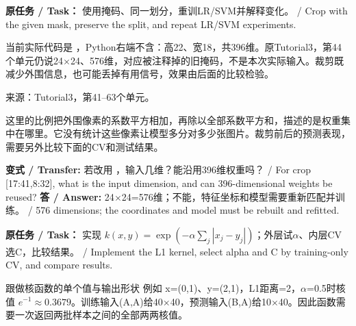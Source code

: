 \textbf{原任务 / Task：} 使用掩码、同一划分，重训LR/SVM并解释变化。 / Crop with the given mask, preserve the split, and repeat LR/SVM experiments.


当前实际代码是 ，Python右端不含：高22、宽18，共396维。原Tutorial3，第44个单元仍说24\ensuremath{\times}24、576维，对应被注释掉的旧掩码，不是本次实际输入。裁剪既减少外围信息，也可能丢掉有用信号，效果由后面的比较检验。


来源：Tutorial3，第41–63个单元。












这里的比例把外围像素的系数平方相加，再除以全部系数平方和，描述的是权重集中在哪里。它没有统计这些像素让模型多分对多少张图片。裁剪前后的预测表现，需要另外比较下面的CV和测试结果。


\textbf{变式 / Transfer:} 若改用 ，输入几维？能沿用396维权重吗？ / For crop [17:41,8:32], what is the input dimension, and can 396-dimensional weights be reused?
\textbf{答 / Answer:} 24\ensuremath{\times}24=576维；不能，特征坐标和模型需要重新匹配并训练。 / 576 dimensions; the coordinates and model must be rebuilt and refitted.







\textbf{原任务 / Task：} 实现 \(k(x,y)=\exp(-\alpha\sum_j|x_j-y_j|)\)；外层试\ensuremath{\alpha}、内层CV选C，比较结果。 / Implement the L1 kernel, select alpha and C by training-only CV, and compare results.


\begin{StudyBlock}{跟做}{核函数的单个值与输出形状}
例如 x=(0,1)、y=(2,1)，L1距离=2，\ensuremath{\alpha}=0.5时核值 \(e^{-1}\approx0.3679\)。训练输入(A,A)给40\ensuremath{\times}40，预测输入(B,A)给10\ensuremath{\times}40。因此函数需要一次返回两批样本之间的全部两两核值。
\end{StudyBlock}


